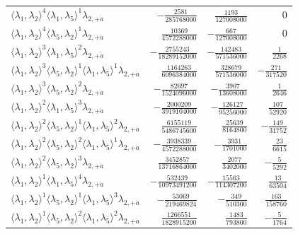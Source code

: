 \begin{longtable}{@{}lrrr@{}}
$\langle\lambda_1,\lambda_2\rangle^{4}\langle\lambda_1,\lambda_5\rangle^{1}\lambda_{2,+\dot a}$ & $-\frac{2581}{285768000}$ & $\frac{1193}{127008000}$ & $0$ \\
$\langle\lambda_1,\lambda_2\rangle^{4}\langle\lambda_5,\lambda_2\rangle^{1}\lambda_{2,+\dot a}$ & $\frac{10369}{4572288000}$ & $-\frac{667}{127008000}$ & $0$ \\
$\langle\lambda_1,\lambda_2\rangle^{3}\langle\lambda_1,\lambda_5\rangle^{2}\lambda_{2,+\dot a}$ & $-\frac{2755243}{18289152000}$ & $-\frac{142483}{571536000}$ & $\frac{1}{2268}$ \\
$\langle\lambda_1,\lambda_2\rangle^{3}\langle\lambda_5,\lambda_2\rangle^{1}\langle\lambda_1,\lambda_5\rangle^{1}\lambda_{2,+\dot a}$ & $\frac{1164263}{6096384000}$ & $\frac{328679}{571536000}$ & $-\frac{271}{317520}$ \\
$\langle\lambda_1,\lambda_2\rangle^{3}\langle\lambda_5,\lambda_2\rangle^{2}\lambda_{2,+\dot a}$ & $-\frac{82697}{1524096000}$ & $-\frac{3907}{13608000}$ & $\frac{1}{2646}$ \\
$\langle\lambda_1,\lambda_2\rangle^{2}\langle\lambda_1,\lambda_5\rangle^{3}\lambda_{2,+\dot a}$ & $-\frac{2000209}{3919104000}$ & $-\frac{126127}{95256000}$ & $\frac{107}{52920}$ \\
$\langle\lambda_1,\lambda_2\rangle^{2}\langle\lambda_5,\lambda_2\rangle^{1}\langle\lambda_1,\lambda_5\rangle^{2}\lambda_{2,+\dot a}$ & $\frac{6155119}{5486745600}$ & $\frac{25639}{8164800}$ & $-\frac{149}{31752}$ \\
$\langle\lambda_1,\lambda_2\rangle^{2}\langle\lambda_5,\lambda_2\rangle^{2}\langle\lambda_1,\lambda_5\rangle^{1}\lambda_{2,+\dot a}$ & $-\frac{3938339}{4572288000}$ & $-\frac{3931}{1701000}$ & $\frac{23}{6615}$ \\
$\langle\lambda_1,\lambda_2\rangle^{2}\langle\lambda_5,\lambda_2\rangle^{3}\lambda_{2,+\dot a}$ & $\frac{3452857}{13716864000}$ & $\frac{2077}{3402000}$ & $-\frac{5}{5292}$ \\
$\langle\lambda_1,\lambda_2\rangle^{1}\langle\lambda_1,\lambda_5\rangle^{4}\lambda_{2,+\dot a}$ & $-\frac{532439}{10973491200}$ & $-\frac{15563}{114307200}$ & $\frac{13}{63504}$ \\
$\langle\lambda_1,\lambda_2\rangle^{1}\langle\lambda_5,\lambda_2\rangle^{1}\langle\lambda_1,\lambda_5\rangle^{3}\lambda_{2,+\dot a}$ & $-\frac{53069}{219469824}$ & $-\frac{349}{510300}$ & $\frac{163}{158760}$ \\
$\langle\lambda_1,\lambda_2\rangle^{1}\langle\lambda_5,\lambda_2\rangle^{2}\langle\lambda_1,\lambda_5\rangle^{2}\lambda_{2,+\dot a}$ & $\frac{1266551}{1828915200}$ & $\frac{1483}{793800}$ & $-\frac{5}{1764}$ \\

\end{longtable}
